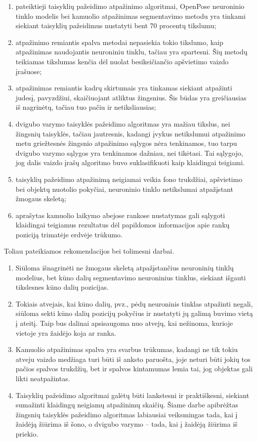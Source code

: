 \documentclass{VUMIFPSbakalaurinis}
\begin{document}
{\begin{enumerate}
	\item pateiktieji taisyklių pažeidimo atpažinimo algoritmai, OpenPose neuroninio tinklo modelis bei kamuolio atpažinimas segmentavimo metodu yra tinkami siekiant taisyklių pažeidimus nustatyti bent 70 procentų tikslumu;
	\item atpažinimo remiantis spalva metodai nepasiekia tokio tikslumo, kaip atpažinimas naudojantis neuroniniu tinklu, tačiau yra spartesni. Šių metodų teikiamas tikslumas kenčia dėl nuolat besikeičiančio apšvietimo vaizdo įrašuose;
	\item atpažinimas remiantis kadrų skirtumais yra tinkamas siekiant atpažinti judesį, pavyzdžiui, skaičiuojant atliktus žingsnius. Šis būdas yra greičiausias iš nagrinėtų, tačiau tuo pačiu ir netiksliausias;
	\item dvigubo varymo taisyklės pažeidimo algoritmas yra mažiau tikslus, nei žingsnių taisyklės, tačiau jautresnis, kadangi įvykus netikslumui atpažinimo metu griežtesnės žingsnio atpažinimo sąlygos nėra tenkinamos, tuo tarpu dvigubo varymo sąlygos yra tenkinamos dažniau, nei tikėtasi. Tai sąlygojo, jog dalis vaizdo įrašų algoritmo buvo suklasifikuoti kaip klaidingai teigiami.
	\item taisyklių pažeidimo atpažinimą neigiamai veikia fono trukdžiai, apšvietimo bei objektų nuotolio pokyčiai, neuroninio tinklo netikslumai atpažįstant žmogaus skeletą;
	\item aprašytas kamuolio laikymo abejose rankose nustatymas gali sąlygoti klaidingai teigiamus rezultatus dėl papildomos informacijos apie rankų poziciją trimatėje erdvėje trūkumo.
\end{enumerate}

Toliau pateikiamos rekomendacijos bei tolimesni darbai.

\begin{enumerate}
	\item Siūloma išnagrinėti ne žmogaus skeletą atpažįstančius neuroninių tinklų modelius, bet kūno dalių segmentavimo neuroninius tinklus, siekiant išgauti tikslesnes kūno dalių pozicijas.
	\item Tokiais atvejais, kai kūno dalių, pvz., pėdų neuroninis tinklas atpažinti negali, siūloma sekti kūno dalių pozicijų pokyčius ir nustatyti jų galimą buvimo vietą į ateitį. Taip bus dalinai apsisaugoma nuo atvejų, kai nežinoma, kurioje vietoje yra žaidėjo koja ar ranka.
	\item Kamuolio atpažinimas spalva yra svarbus trūkumas, kadangi ne tik tokiu atveju vaizdo medžiaga turi būti iš anksto paruošta, joje neturi būti jokių tos pačios spalvos trukdžių, bet ir spalvos kintamumas lemia tai, jog objektas gali likti neatpažintas. 
	\item Taisyklių pažeidimo algoritmai galėtų būti lankstesni ir praktiškesni, siekiant sumažinti klaidingų neigiamų atpažinimų skaičių. Šiame darbe apibrėžtas žingsnių taisyklės pažeidimo algoritmas labiausiai veiksmingas tada, kai į žaidėją žiūrima iš šono, o dvigubo varymo – tada, kai į žaidėją žiūrima iš priekio. 
\end{enumerate}
}
\end{document}
